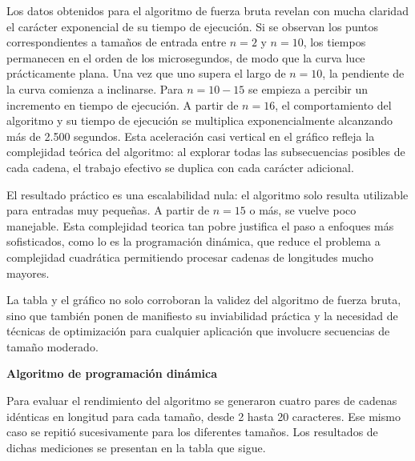 Los datos obtenidos para el algoritmo de fuerza bruta revelan con mucha claridad el carácter exponencial de su tiempo de ejecución. Si se observan los puntos correspondientes a tamaños de entrada entre $n=2$ y $n=10$, los tiempos permanecen en el orden de los microsegundos, de modo que la curva luce prácticamente plana. Una vez que uno supera el largo de $n=10$, la pendiente de la curva comienza a inclinarse. Para $n=10-15$ se empieza a percibir un incremento en tiempo de ejecución. A partir de $n=16$, el comportamiento del algoritmo y su tiempo de ejecución se multiplica exponencialmente alcanzando más de 2.500 segundos. Esta aceleración casi vertical en el gráfico refleja la complejidad teórica del algoritmo: al explorar todas las subsecuencias posibles de cada cadena, el trabajo efectivo se duplica con cada carácter adicional.

\vspace{0.5 cm}

El resultado práctico es una escalabilidad nula: el algoritmo solo resulta utilizable para entradas muy pequeñas. A partir de $n=15$ o más, se vuelve poco manejable. Esta complejidad teorica tan pobre justifica el paso a enfoques más sofisticados, como lo es la programación dinámica, que reduce el problema a complejidad cuadrática permitiendo procesar cadenas de longitudes mucho mayores.

\vspace{0.5 cm}

La tabla y el gráfico no solo corroboran la validez del algoritmo de fuerza bruta, sino que también ponen de manifiesto su inviabilidad práctica y la necesidad de técnicas de optimización para cualquier aplicación que involucre secuencias de tamaño moderado.

\vspace{0.5 cm}

\textbf{Algoritmo de programación dinámica}

Para evaluar el rendimiento del algoritmo se generaron cuatro pares de cadenas idénticas en longitud para cada tamaño, desde 2 hasta 20 caracteres. Ese mismo caso se repitió sucesivamente para los diferentes tamaños. Los resultados de dichas mediciones se presentan en la tabla que sigue.

